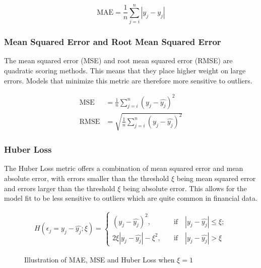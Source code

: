 \documentclass[a4paper]{article}
\begin{document}
	\begin{equation}
	\text{MAE} = \frac{1}{n} \sum_{j = i}^{n} |y_j - \hat{y_j}|
	\end{equation}
	
	\subsubsection{Mean Squared Error and Root Mean Squared Error}
	
	The mean squared error (MSE) and root mean squared error (RMSE) are quadratic scoring methods. This means that they place higher weight on large errors. Models that minimize this metric are therefore more sensitive to outliers. 
	
	\begin{align}
	\text{MSE} &= \frac{1}{n} \sum_{j = i}^{n} \left( y_j - \hat{y_j}\right) ^2 \\
	\text{RMSE} &= \sqrt{ \frac{1}{n} \sum_{j = i}^{n} \left( y_j - \hat{y_j}\right) ^2}
	\end{align}
	
	\subsubsection{Huber Loss}
	
	The Huber Loss metric \citep{huber_robust_1992} offers a combination of mean squared error and mean absolute error, with errors smaller than the threshold $\xi$ being mean squared error and errors larger than the threshold $\xi$ being absolute error. This allows for the model fit to be less sensitive to outliers which are quite common in financial data. 
	
	\begin{align}
	H(\epsilon_j = y_j - \hat{y_j};\xi) = 
	\begin{cases}
	\left( y_j - \hat{y_j}\right) ^2, 
	\quad &\text{if} \quad |y_j - \hat{y_j}| \leq \xi ; \\
	2 \xi  |y_j - \hat{y_j}| - \xi^2, 
	\quad &\text{if} \quad |y_j - \hat{y_j}| > \xi
	\end{cases}
	\end{align}
	
	\begin{figure}
		\begin{center}
		\end{center}
		\caption{Illustration of MAE, MSE and Huber Loss when $\xi = 1$}
		\label{fig:loss_functions}
	\end{figure}
	
\end{document}
